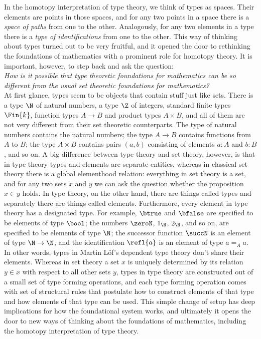 In the homotopy interpretation of type theory, we think of types as spaces. Their elements are points in those spaces, and for any two points in a space there is a \emph{space of paths} from one to the other. Analogously, for any two elements in a type there is a \emph{type of identifications} from one to the other. This way of thinking about types turned out to be very fruitful, and it opened the door to rethinking the foundations of mathematics with a prominent role for homotopy theory. It is important, however, to step back and ask the question:
\\[\baselineskip]
\emph{How is it possible that type theoretic foundations for mathematics can be so different from the usual set theoretic foundations for mathematics?}
\\[\baselineskip]
At first glance, types seem to be objects that contain stuff just like sets. There is a type $\N$ of natural numbers, a type $\Z$ of integers, standard finite types $\Fin{k}$, function types $A\to B$ and product types $A\times B$, and all of them are not very different from their set theoretic counterparts. The type of natural numbers contains the natural numbers; the type $A\to B$ contains functions from $A$ to $B$; the type $A\times B$ contains pairs $(a,b)$ consisting of elements $a:A$ and $b:B$, and so on. A big difference between type theory and set theory, however, is that in type theory types and elements are separate entities, whereas in classical set theory there is a global elementhood relation: everything in set theory is a set, and for any two sets $x$ and $y$ we can ask the question whether the proposition $x\in y$ holds. In type theory, on the other hand, there are things called types and separately there are things called elements. Furthermore, every element in type theory has a designated type. For example, $\btrue$ and $\bfalse$ are specified to be elements of type $\bool$; the numbers $\zeroN$, $1_\N$, $2_\N$, and so on, are specified to be elements of type $\N$; the successor function $\succN$ is an element of type $\N\to\N$, and the identification $\refl{a}$ is an element of type $a=_A a$. In other words, types in Martin L\"of's dependent type theory don't share their elements. Whereas in set theory a set $x$ is uniquely determined by its relation $y\in x$ with respect to all other sets $y$, types in type theory are constructed out of a small set of type forming operations, and each type forming operation comes with set of structural rules that postulate how to construct elements of that type and how elements of that type can be used. This simple change of setup has deep implications for how the foundational system works, and ultimately it opens the door to new ways of thinking about the foundations of mathematics, including the homotopy interpretation of type theory.


